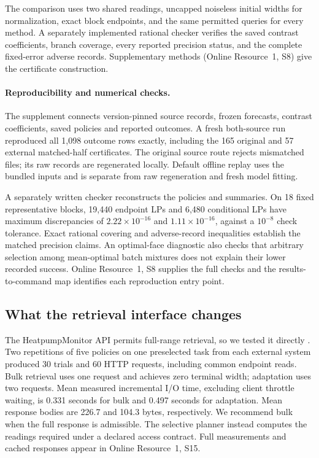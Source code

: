 \documentclass[12pt]{article}
\begin{document}
The comparison uses two shared readings, uncapped noiseless initial widths for
normalization, exact block endpoints, and the same permitted queries for
every method.  A separately implemented rational checker verifies the
saved contrast coefficients, branch coverage, every reported precision
status, and the complete fixed-error adverse records.  Supplementary
methods (Online Resource~1, S8) give the certificate construction.
\paragraph{Reproducibility and numerical checks.}
The supplement connects version-pinned source records, frozen forecasts,
contrast coefficients, saved policies and reported outcomes. A fresh
both-source run reproduced all 1,098 outcome rows exactly, including the
165 original and 57 external matched-half certificates. The original
source route rejects mismatched files; its raw records are regenerated
locally. Default offline replay uses the bundled inputs and is separate
from raw regeneration and fresh model fitting.

A separately written checker reconstructs the policies and summaries. On
18 fixed representative blocks, 19,440 endpoint LPs and 6,480 conditional
LPs have maximum discrepancies of $2.22\times10^{-16}$ and
$1.11\times10^{-16}$, against a $10^{-8}$ check tolerance. Exact rational
covering and adverse-record inequalities establish the matched precision
claims. An optimal-face diagnostic also checks that arbitrary selection
among mean-optimal batch mixtures does not explain their lower recorded
success. Online Resource~1, S8 supplies the full checks and the
results-to-command map identifies each reproduction entry point.
\subsection{What the retrieval interface changes}
\label{sec:actual-api}
The HeatpumpMonitor API permits full-range retrieval, so we tested it
directly \citep{hpmapi,hpmcode}. Two repetitions of five policies on one
preselected task from each external system produced 30 trials and 60 HTTP
requests, including common endpoint reads. Bulk retrieval uses one request
and achieves zero terminal width; adaptation uses two requests.
Mean measured incremental I/O time, excluding client throttle waiting,
is 0.331 seconds for bulk and 0.497 seconds for adaptation. Mean response bodies
are 226.7 and 104.3 bytes, respectively. We recommend bulk when the full
response is admissible. The selective planner instead computes the readings
required under a declared access contract. Full measurements and cached
responses appear in Online Resource~1, S15.
\end{document}
